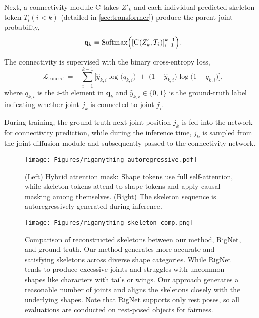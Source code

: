 Next, a connectivity module C takes $Z'_{k}$ and each individual predicted skeleton token $T_i (i < k)$ (detailed in \cref{sec:transformer})  produce the parent joint probability,   
\begin{equation}
    \mathbf{q}_{k} = \text{Softmax}\Bigl ([ \text{C} (Z'_{k}, T_i) ]_{i=1}^{k-1} \Bigr ).
\end{equation}

The connectivity is supervised with the binary cross-entropy loss,
\begin{equation}
    \mathcal{L}_{\text{connect}} 
    = - \sum_{i=1}^{k-1}
    \bigl[
        \hat{y}_{k,i} \log\bigl(q_{k,i}\bigr)
        \;+\;
        \bigl(1 - \hat{y}_{k,i}\bigr) \log\bigl(1 - q_{k,i}\bigr)
    \bigr],
\end{equation}
where $q_{k,i}$ is the $i$-th element in $\mathbf{q}_k$ and $\hat{y}_{k,i} \in \{0, 1 \}$ is the ground-truth label indicating whether joint $j_{k}$ is connected to joint $j_i$.

During training, the ground-truth next joint position $j_{k}$ is fed into the network for connectivity prediction, while during the inference time, $j_{k}$ is sampled from the joint diffusion module and subsequently passed to the connectivity network.

\begin{figure}[t]
\texttt{[image: Figures/riganything-autoregressive.pdf]}
\caption{(Left) Hybrid attention mask: Shape tokens use full self-attention, while skeleton tokens attend to shape tokens and apply causal masking among themselves. (Right) The skeleton sequence is autoregressively generated during inference.}\vspace{-3mm}
\label{fig:autoregressive}
\end{figure}

\begin{figure*}[t]
\texttt{[image: Figures/riganything-skeleton-comp.png]}
\caption{Comparison of reconstructed skeletons between our method, RigNet, and ground truth. Our method generates more accurate and satisfying skeletons across diverse shape categories. While RigNet tends to produce excessive joints and struggles with uncommon shapes like characters with tails or wings. Our approach generates a reasonable number of joints and aligns the skeletons closely with the underlying shapes. Note that RigNet supports only rest poses, so all evaluations are conducted on rest-posed objects for fairness.}
\vspace{-3mm}
\label{fig: skeleton_comp}
\end{figure*}

